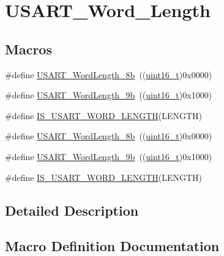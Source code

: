 \hypertarget{group___u_s_a_r_t___word___length}{}\section{U\+S\+A\+R\+T\+\_\+\+Word\+\_\+\+Length}
\label{group___u_s_a_r_t___word___length}
\subsection*{Macros}
\begin{DoxyCompactItemize}
\item 
\#define \hyperlink{group___u_s_a_r_t___word___length_ga08682faddc657df85a93627b5a146c25}{U\+S\+A\+R\+T\+\_\+\+Word\+Length\+\_\+8b}~((\hyperlink{_p_e___types_8h_a1f1825b69244eb3ad2c7165ddc99c956}{uint16\+\_\+t})0x0000)
\item 
\#define \hyperlink{group___u_s_a_r_t___word___length_gae7dd162142660e09e2321aa3f33dc4d2}{U\+S\+A\+R\+T\+\_\+\+Word\+Length\+\_\+9b}~((\hyperlink{_p_e___types_8h_a1f1825b69244eb3ad2c7165ddc99c956}{uint16\+\_\+t})0x1000)
\item 
\#define \hyperlink{group___u_s_a_r_t___word___length_ga5b07b29ee91f0bea4c10ec0fd74fbc04}{I\+S\+\_\+\+U\+S\+A\+R\+T\+\_\+\+W\+O\+R\+D\+\_\+\+L\+E\+N\+G\+TH}(L\+E\+N\+G\+TH)
\item 
\#define \hyperlink{group___u_s_a_r_t___word___length_ga08682faddc657df85a93627b5a146c25}{U\+S\+A\+R\+T\+\_\+\+Word\+Length\+\_\+8b}~((\hyperlink{_p_e___types_8h_a1f1825b69244eb3ad2c7165ddc99c956}{uint16\+\_\+t})0x0000)
\item 
\#define \hyperlink{group___u_s_a_r_t___word___length_gae7dd162142660e09e2321aa3f33dc4d2}{U\+S\+A\+R\+T\+\_\+\+Word\+Length\+\_\+9b}~((\hyperlink{_p_e___types_8h_a1f1825b69244eb3ad2c7165ddc99c956}{uint16\+\_\+t})0x1000)
\item 
\#define \hyperlink{group___u_s_a_r_t___word___length_ga5b07b29ee91f0bea4c10ec0fd74fbc04}{I\+S\+\_\+\+U\+S\+A\+R\+T\+\_\+\+W\+O\+R\+D\+\_\+\+L\+E\+N\+G\+TH}(L\+E\+N\+G\+TH)
\end{DoxyCompactItemize}


\subsection{Detailed Description}


\subsection{Macro Definition Documentation}
